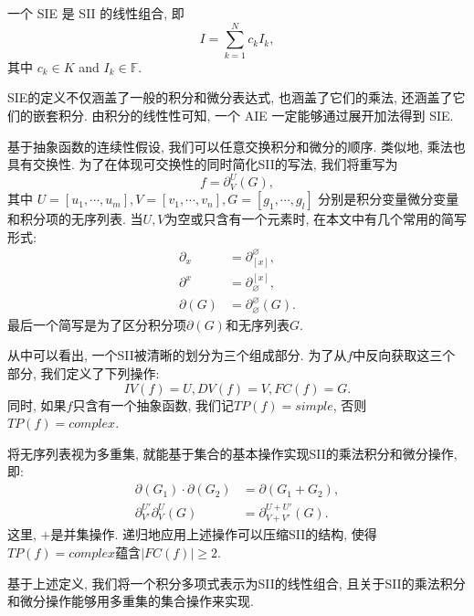 \begin{definition}
一个 SIE 是 SII 的线性组合, 即
\begin{equation}
I = \sum_{k=1}^N{c_k I_k}, 
\label{std_form}
\end{equation} 
其中 $c_k \in K$ and $I_k \in \mathbb F$. 
\end{definition}

SIE的定义不仅涵盖了一般的积分和微分表达式, 也涵盖了它们的乘法, 还涵盖了它们的嵌套积分. 由积分的线性性可知, 一个 AIE 一定能够通过展开加法得到 SIE.

基于抽象函数的连续性假设, 我们可以任意交换积分和微分的顺序. 类似地, 乘法也具有交换性. 为了在体现可交换性的同时简化SII的写法, 我们将重写为
\begin{equation} 
f=\partial^U_V(G),  \label{st_form}
\end{equation} 
其中 $U=[u_1,\cdots,u_m], V=[v_1,\cdots,v_n], G=[g_1,\cdots,g_l]$ 分别是积分变量\D 微分变量和积分项的无序列表. 当$U,V$为空或只含有一个元素时, 在本文中有几个常用的简写形式:
\begin{equation}
\begin{split}
\partial_x&=\partial^\varnothing_{[x]},  \\
\partial^x&=\partial_\varnothing^{[x]},  \\ 
\partial(G)&=\partial^\varnothing_\varnothing(G).
\end{split}
\end{equation}
最后一个简写是为了区分积分项$\partial(G)$和无序列表$G$. 

从中可以看出, 一个SII被清晰的划分为三个组成部分. 为了从$f$中反向获取这三个部分, 我们定义了下列操作:
\begin{equation}
IV(f)=U,DV(f)=V,FC(f)=G.
\end{equation}
同时, 如果$f$只含有一个抽象函数, 我们记$TP(f)=simple$, 否则$TP(f)=complex$. 

将无序列表视为多重集, 就能基于集合的基本操作实现SII的乘法\D 积分和微分操作, 即:
\begin{equation}
\begin{split}
\partial(G_1)\cdot\partial(G_2)&=\partial(G_1+G_2),\\
\partial^{U'}_{V'}\partial^{U}_{V}(G)&=\partial^{U+U'}_{V+V'}(G).
\end{split}
\label{ops}
\end{equation}
这里, $+$是并集操作. 递归地应用上述操作可以压缩SII的结构, 使得$TP(f)=complex$蕴含$|FC(f)|\ge 2$. 

基于上述定义, 我们将一个积分多项式表示为SII的线性组合, 且关于SII的乘法\D 积分和微分操作能够用多重集的集合操作来实现. 

